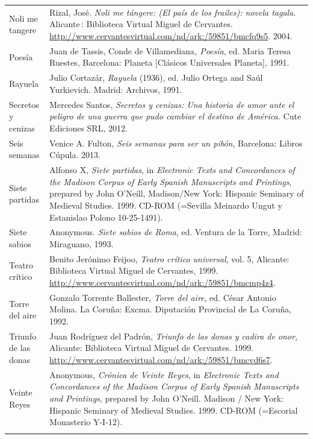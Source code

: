 \begin{tabularx}{\textwidth}{XX}
Noli me tangere & Rizal, José. \textit{Noli me tángere: (El país de los frailes): novela tagala}. Alicante : Biblioteca Virtual Miguel de Cervantes. \url{http://www.cervantesvirtual.com/nd/ark:/59851/bmcfq9s5}. 2004.\\
Poesía & Juan de Tassis, Conde de Villamediana\textit{, Poesía}, ed. Maria Teresa Ruestes, Barcelona: Planeta [Clásicos Universales Planeta], 1991.\\
Rayuela & Julio Cortazár, \textit{Rayuela} (1936), ed. Julio Ortega and Saúl Yurkievich. Madrid: Archivos, 1991.\\
Secretos y cenizas & Mercedes Santos, \textit{Secretos y cenizas: Una historia de amor ante el peligro de una guerra que pudo cambiar el destino de América.} Cute Ediciones SRL, 2012.\\
Seis semanas  & Venice A. Fulton, \textit{Seis semanas para ser un pibón}, Barcelona: Libros Cúpula. 2013.\\
Siete partidas & Alfonso X, \textit{Siete partidas}, in \textit{Electronic Texts and Concordances of the Madison Corpus of Early Spanish Manuscripts and Printings}, prepared by John O’Neill, Madison/New York: Hispanic Seminary of Medieval Studies. 1999. CD-ROM (=Sevilla Meinardo Ungut y Estanislao Polono 10-25-1491).\\
Siete sabios & Anonymous. \textit{Siete sabios de Roma}, ed. Ventura de la Torre, Madrid: Miraguano, 1993.\\
Teatro crítico  & Benito Jerónimo Feijoo, \textit{Teatro crítico universal}, vol. 5, Alicante: Biblioteca Virtual Miguel de Cervantes, 1999. \url{http://www.cervantesvirtual.com/nd/ark:/59851/bmcmp4z4}.\\
Torre del aire & Gonzalo Torrente Ballester, \textit{Torre del aire}, ed. César Antonio Molina. La Coruña: Excma. Diputación Provincial de La Coruña, 1992.\\
Triunfo de las donas & Juan Rodríguez del Padrón, \textit{Triunfo de las donas y cadira de onor}, Alicante: Biblioteca Virtual Miguel de Cervantes. 1999. \url{http://www.cervantesvirtual.com/nd/ark:/59851/bmcvd6s7}.\\
Veinte Reyes & Anonymous, \textit{Crónica de Veinte Reyes}, in \textit{Electronic Texts and Concordances of the Madison Corpus of Early Spanish Manuscripts and Printings}, prepared by John O’Neill. Madison / New York: Hispanic Seminary of Medieval Studies. 1999. CD-ROM (=Escorial Monasterio Y-I-12).\\
\lspbottomrule
\end{tabularx}
